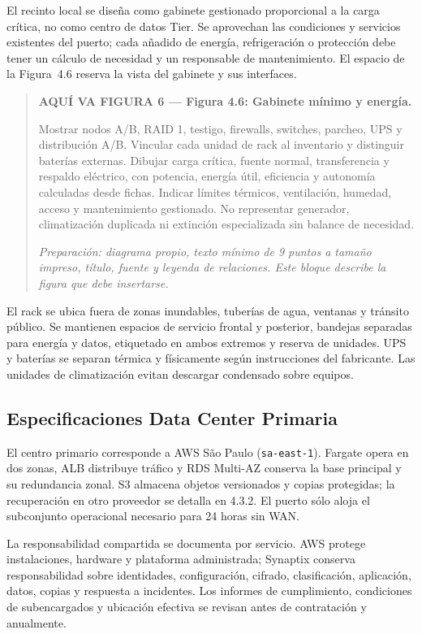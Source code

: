 \documentclass[11pt,letterpaper]{report}
\begin{document}
El recinto local se diseña como gabinete gestionado proporcional a la carga crítica, no como centro de datos Tier. Se aprovechan las condiciones y servicios existentes del puerto; cada añadido de energía, refrigeración o protección debe tener un cálculo de necesidad y un responsable de mantenimiento. El espacio de la Figura~4.6 reserva la vista del gabinete y sus interfaces.
\par\medskip
\begin{quote}\textbf{AQUÍ VA FIGURA 6 — Figura 4.6: Gabinete mínimo y energía.}\par Mostrar nodos A/B, RAID 1, testigo, firewalls, switches, parcheo, UPS y distribución A/B. Vincular cada unidad de rack al inventario y distinguir baterías externas. Dibujar carga crítica, fuente normal, transferencia y respaldo eléctrico, con potencia, energía útil, eficiencia y autonomía calculadas desde fichas. Indicar límites térmicos, ventilación, humedad, acceso y mantenimiento gestionado. No representar generador, climatización duplicada ni extinción especializada sin balance de necesidad.\par\textit{Preparación: diagrama propio, texto mínimo de 9 puntos a tamaño impreso, título, fuente y leyenda de relaciones. Este bloque describe la figura que debe insertarse.}\end{quote}
\par\medskip

El rack se ubica fuera de zonas inundables, tuberías de agua, ventanas y tránsito público. Se mantienen espacios de servicio frontal y posterior, bandejas separadas para energía y datos, etiquetado en ambos extremos y reserva de unidades. UPS y baterías se separan térmica y físicamente según instrucciones del fabricante. Las unidades de climatización evitan descargar condensado sobre equipos.

\subsection{Especificaciones Data Center Primaria}

El centro primario corresponde a AWS São Paulo (\texttt{sa-east-1}). Fargate opera en dos zonas, ALB distribuye tráfico y RDS Multi-AZ conserva la base principal y su redundancia zonal. S3 almacena objetos versionados y copias protegidas; la recuperación en otro proveedor se detalla en 4.3.2. El puerto sólo aloja el subconjunto operacional necesario para 24 horas sin WAN.

La responsabilidad compartida se documenta por servicio. AWS protege instalaciones, hardware y plataforma administrada; Synaptix conserva responsabilidad sobre identidades, configuración, cifrado, clasificación, aplicación, datos, copias y respuesta a incidentes. Los informes de cumplimiento, condiciones de subencargados y ubicación efectiva se revisan antes de contratación y anualmente.
\end{document}
